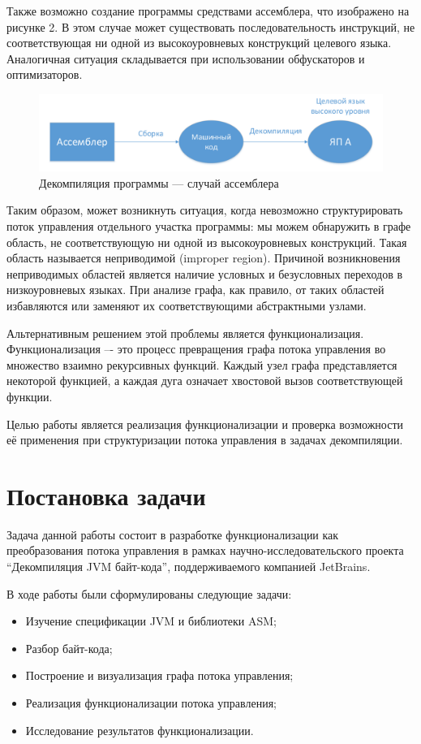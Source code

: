 Также возможно создание программы средствами ассемблера, что изображено на рисунке 2. В этом случае может существовать последовательность инструкций, не соответствующая ни одной из высокоуровневых конструкций целевого языка. Аналогичная ситуация складывается при использовании обфускаторов и оптимизаторов.

\begin{figure}[H]
\includegraphics[width=1\linewidth]{Zabransky/gr2.pdf} 
\caption{Декомпиляция программы --- случай ассемблера}
\end{figure}

Таким образом, может возникнуть ситуация, когда невозможно структурировать поток управления отдельного участка программы: мы можем обнаружить в графе область, не соответствующую ни одной из высокоуровневых конструкций. Такая область называется неприводимой (improper region). Причиной возникновения неприводимых областей является наличие условных и безусловных переходов в низкоуровневых языках. При анализе графа, как правило, от таких областей избавляются или заменяют их соответствующими абстрактными узлами.

Альтернативным решением этой проблемы является функционализация. Функционализация –- это процесс превращения графа потока управления во множество взаимно рекурсивных функций. Каждый узел графа представляется некоторой функцией, а каждая дуга означает хвостовой вызов соответствующей функции.

Целью работы является реализация функционализации и проверка возможности её применения при структуризации потока управления в задачах декомпиляции.

\section{Постановка задачи}
Задача данной работы состоит в разработке функционализации как преобразования потока управления в рамках научно-исследовательского проекта “Декомпиляция JVM байт-кода”, поддерживаемого компанией JetBrains. 

\vspace{0.3cm}
В ходе работы были сформулированы следующие задачи:
\begin{itemize}
\item Изучение спецификации JVM и библиотеки ASM;
\item Разбор байт-кода;
\item Построение и визуализация графа потока управления;
\item Реализация функционализации потока управления;
\item Исследование результатов функционализации.
\end{itemize}

